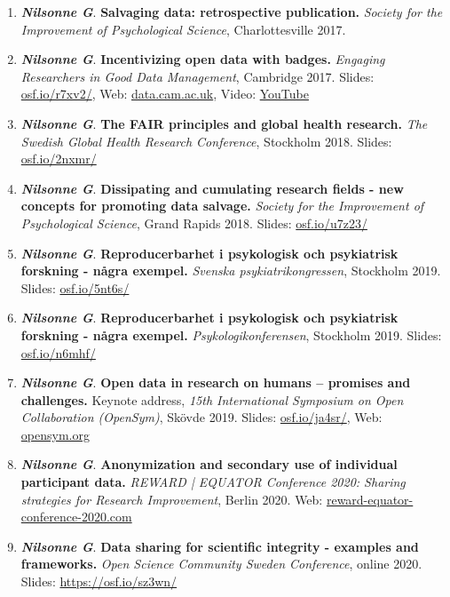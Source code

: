 \documentclass[10pt]{article}
\begin{document}
\begin{enumerate}[nolistsep]
\item \textbf{\textit{Nilsonne G}}. \textbf{Salvaging data: retrospective publication.} \emph{Society for the Improvement of Psychological Science}, Charlottesville  2017. 
\item \textbf{\textit{Nilsonne G}}. \textbf{Incentivizing open data with badges.} \emph{Engaging Researchers in Good Data Management}, Cambridge 2017. Slides: \href{https://osf.io/r7xv2/}{osf.io/r7xv2/}, Web: \href{https://www.data.cam.ac.uk/datanews/engaging-researchers-good-data-management-2017-conference}{data.cam.ac.uk}, Video: \href{https://www.youtube.com/watch?v=FztK2AG0W4Y&feature=youtu.be}{YouTube}
\item \textbf{\textit{Nilsonne G}}. \textbf{The FAIR principles and global health research.} \emph{The Swedish Global Health Research Conference}, Stockholm 2018. Slides: \href{https://osf.io/2nxmr/}{osf.io/2nxmr/} 
\item \textbf{\textit{Nilsonne G}}. \textbf{Dissipating and cumulating research fields - new concepts for promoting data salvage.} \emph{Society for the Improvement of Psychological Science}, Grand Rapids 2018. Slides: \href{https://osf.io/u7z23/}{osf.io/u7z23/}
\item \textbf{\textit{Nilsonne G}}. \textbf{Reproducerbarhet i psykologisk och psykiatrisk forskning - några exempel.} \emph{Svenska psykiatrikongressen}, Stockholm 2019. Slides: \href{https://osf.io/5nt6s/}{osf.io/5nt6s/}
\item \textbf{\textit{Nilsonne G}}. \textbf{Reproducerbarhet i psykologisk och psykiatrisk forskning - några exempel.} \emph{Psykologikonferensen}, Stockholm 2019. Slides: \href{https://osf.io/n6mhf/}{osf.io/n6mhf/}
\item \textbf{\textit{Nilsonne G}}. \textbf{Open data in research on humans – promises and challenges.} Keynote address, \emph{15th  International Symposium on Open Collaboration (OpenSym)}, Skövde 2019. Slides: \href{https://osf.io/ja4sr/}{osf.io/ja4sr/}, Web: \href{https://opensym.org/os2019/keynotes/}{opensym.org}
\item \textbf{\textit{Nilsonne G}}. \textbf{Anonymization and secondary use of individual participant data.} \emph{REWARD | EQUATOR Conference 2020: Sharing strategies for Research Improvement}, Berlin 2020. Web: \href{https://www.reward-equator-conference-2020.com/programme/#programme}{reward-equator-conference-2020.com}
\item \textbf{\textit{Nilsonne G}}. \textbf{Data sharing for scientific integrity - examples and frameworks.} \emph{Open Science Community Sweden Conference}, online 2020. Slides: \href{https://osf.io/sz3wn/}{https://osf.io/sz3wn/}

\end{enumerate}
\end{document}
